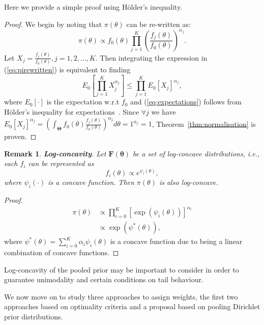 \documentclass[a4paper, notitlepage, 11pt]{article}
\newtheorem{remark}{Remark}[]
\begin{document}
Here we provide a simple proof using H\"{o}lder's inequality.
\begin{proof}
We begin by noting that $\pi(\theta)$ can be re-written as:
\begin{equation}
\label{eq:pirewritten}
 \pi(\theta) \propto f_0(\theta)\prod_{j=1}^{K} \left(\frac{f_j(\theta)}{f_0(\theta)}\right)^{\alpha_j}.
\end{equation}
Let $X_j = \frac{f_j(\theta)}{f_0(\theta)}, j=1, 2,\ldots, K$. 
Then integrating the expression in (\ref{eq:pirewritten}) is equivalent to finding 
\begin{equation}
\label{eq:expectations}
E_{0}\left[\prod_{j=1}^KX_j^{\alpha_j}\right] \leq \prod_{j=1}^KE_{0}[X_j]^{\alpha_j},
\end{equation}
where $E_{0}[\cdot]$ is the expectation w.r.t $f_0$ and (\ref{eq:expectations}) follows from H\"{o}lder's inequality for expectations~\citep{yeh2011}.
Since $\forall j$ we have $E_{0}[X_j]^{\alpha_j} = \left(\int_{\boldsymbol\Theta}f_0(\theta)\frac{f_j(\theta)}{f_0(\theta)}\right)^{\alpha_j}d\theta=1^{\alpha_j}=1$, Theorem~\ref{thm:normalisation} is proven.
\end{proof}

\begin{remark}
\textbf{Log-concavity}. 
 Let $\mathbf{F(\theta)}$ be a set of log-concave distributions, i.e., each $f_i$ can be represented as
 \begin{equation}
  \label{eq:logconcavity}
  f_i(\theta) \propto e^{\psi_i(\theta)},
 \end{equation}
where $\psi_i(\cdot)$ is a concave function.
Then $\pi(\theta)$ is also log-concave.
\end{remark}
\begin{proof}
\begin{align}
 \pi(\theta) &\propto \prod_{i=0}^{K} [\exp(\psi_i(\theta))]^{\alpha_i}\\
             &\propto \exp(\psi^{\ast}(\theta)),
\end{align}
 where $\psi^{\ast}(\theta) = \sum_{i=0}^{K}\alpha_i\psi_i(\theta)$ is a concave function due to being a linear combination of concave functions.
\end{proof}
Log-concavity of the pooled prior may be important to consider in order to guarantee unimodality and certain conditions on tail behaviour.

We now move on to study three approaches to assign weights, the first two approaches based on optimality criteria and a proposal based on pooling Dirichlet prior distributions.
\end{document}
